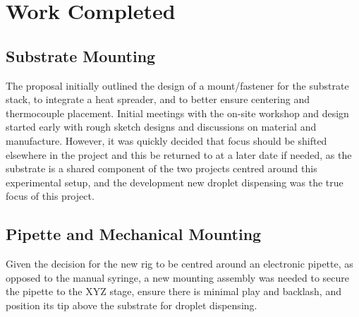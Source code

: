 \chapter{Work Completed}\label{C:work}
\section{Substrate Mounting}
The proposal initially outlined the design of a mount/fastener for the substrate stack, to integrate a heat spreader, and to better ensure centering and thermocouple placement. Initial meetings with the on-site workshop and design started early with rough sketch designs and discussions on material and manufacture. However, it was quickly decided that focus should be shifted elsewhere in the project and this be returned to at a later date if needed, as the substrate is a shared component of the two projects centred around this experimental setup, and the development new droplet dispensing was the true focus of this project.

\section{Pipette and Mechanical Mounting}
Given the decision for the new rig to be centred around an electronic pipette, as opposed to the manual syringe, a new mounting assembly was needed to secure the pipette to the XYZ stage, ensure there is minimal play and backlash, and position its tip above the substrate for droplet dispensing.

